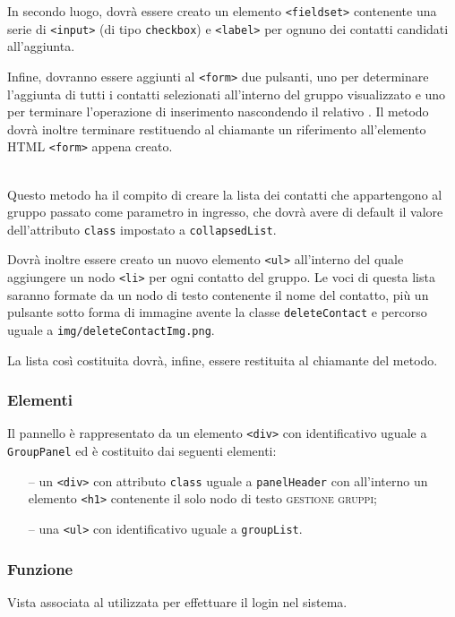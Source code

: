 \begin{description}
  In secondo luogo, dovrà essere creato un elemento \verb'<fieldset>' contenente una serie di \verb'<input>' (di tipo \verb'checkbox') e \verb'<label>' per ognuno dei contatti candidati all'aggiunta.
  
  Infine, dovranno essere aggiunti al \verb'<form>' due pulsanti, uno per determinare l'aggiunta di tutti i contatti selezionati all'interno del gruppo visualizzato e uno per terminare l'operazione di inserimento nascondendo il relativo . Il metodo dovrà inoltre terminare restituendo al chiamante un riferimento all'elemento HTML \verb'<form>' appena creato.
  
  \item{}\\
  Questo metodo ha il compito di creare la lista dei contatti che appartengono al gruppo passato come parametro in ingresso, che dovrà avere di default il valore dell'attributo \verb'class' impostato a \verb'collapsedList'.
  
  Dovrà inoltre essere creato un nuovo elemento \verb'<ul>' all'interno del quale aggiungere un nodo \verb'<li>' per ogni contatto del gruppo. Le voci di questa lista saranno formate da un nodo di testo contenente il nome del contatto, più un pulsante sotto forma di immagine avente la classe \verb'deleteContact' e percorso uguale a \verb'img/deleteContactImg.png'.
  
  La lista così costituita dovrà, infine, essere restituita al chiamante del metodo.

\end{description}

\subsubsection*{Elementi}
Il pannello è rappresentato da un elemento \verb'<div>' con identificativo uguale a \verb'GroupPanel' ed è costituito dai seguenti elementi:
\begin{itemize}
  \item[--] un \verb'<div>' con attributo \verb'class' uguale a \verb'panelHeader' con all'interno un elemento \verb'<h1>' contenente il solo nodo di testo \textsc{gestione gruppi};
  \item[--] una \verb'<ul>' con identificativo uguale a \verb'groupList'.
\end{itemize}


\subsubsection*{Funzione}
Vista associata al   utilizzata per effettuare il login nel sistema.

